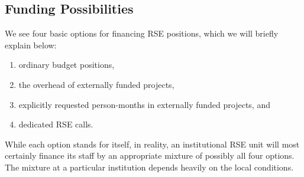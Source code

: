 \documentclass[a4paper]{article}
\begin{document}
\subsection{Funding Possibilities}%
\label{sec:funding}

We see four basic options for financing RSE positions, which we will briefly explain below:
\begin{enumerate}
\item ordinary budget positions,
\item the overhead of externally funded projects,
\item explicitly requested person-months in externally funded projects, and
\item dedicated RSE calls.
\end{enumerate}
While each option stands for itself, in reality, an institutional RSE unit will most certainly finance its staff by an appropriate mixture of possibly all four options.
The mixture at a particular institution depends heavily on the local conditions.
\end{document}
